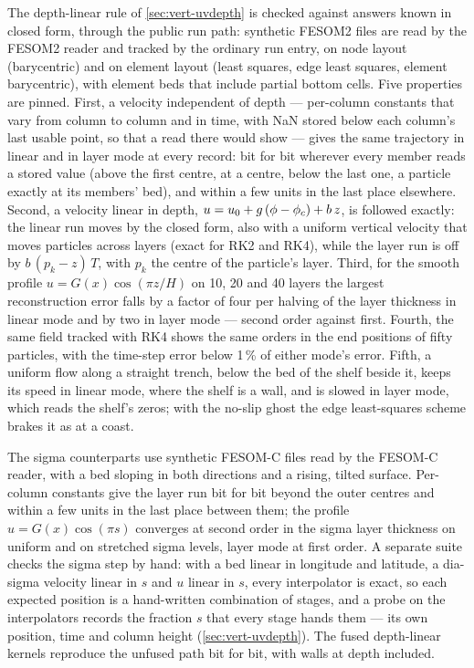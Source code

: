 The depth-linear rule of \cref{sec:vert-uvdepth} is checked against answers known in closed form, through
the public run path: synthetic FESOM2 files are read by the FESOM2 reader and tracked by the ordinary run
entry, on node layout (barycentric) and on element layout (least squares, edge least squares, element
barycentric), with element beds that include partial bottom cells. Five properties are pinned. First, a
velocity independent of depth --- per-column constants that vary from column to column and in time, with
NaN stored below each column's last usable point, so that a read there would show --- gives the same
trajectory in linear and in layer mode at every record: bit for bit wherever every member reads a stored
value (above the first centre, at a centre, below the last one, a particle exactly at its members' bed),
and within a few units in the last place elsewhere. Second, a velocity linear in depth,
$u=u_0+g\,(\phi-\phi_c)+b\,z$, is followed exactly: the linear run moves by the closed form, also with a uniform
vertical velocity that moves particles across layers (exact for RK2 and RK4), while the layer run is
off by $b\,(p_k-z)\,T$, with $p_k$ the centre of the particle's layer. Third, for the smooth profile
$u=G(x)\cos(\pi z/H)$ on 10, 20 and 40 layers the largest reconstruction error falls by a factor of four
per halving of the layer thickness in linear mode and by two in layer mode --- second order against first.
Fourth, the same field tracked with RK4 shows the same orders in the end positions of fifty particles,
with the time-step error below 1\,\% of either mode's error. Fifth, a uniform flow along a straight
trench, below the bed of the shelf beside it, keeps its speed in linear mode, where the shelf is a wall,
and is slowed in layer mode, which reads the shelf's zeros; with the no-slip ghost the edge least-squares
scheme brakes it as at a coast.

The sigma counterparts use synthetic FESOM-C files read by the FESOM-C reader, with a bed sloping in both
directions and a rising, tilted surface. Per-column constants give the layer run bit for bit beyond the
outer centres and within a few units in the last place between them; the profile $u=G(x)\cos(\pi s)$
converges at second order in the sigma layer thickness on uniform and on stretched sigma levels, layer
mode at first order. A separate suite checks the sigma step by hand: with a bed linear in longitude and
latitude, a dia-sigma velocity linear in $s$ and $u$ linear in $s$, every interpolator is exact, so each
expected position is a hand-written combination of stages, and a probe on the interpolators records the
fraction $s$ that every stage hands them --- its own position, time and column height
(\cref{sec:vert-uvdepth}). The fused depth-linear kernels reproduce the unfused path bit for bit, with
walls at depth included.

